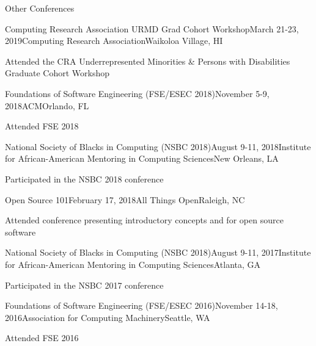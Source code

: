 \documentclass{resume} %
\begin{document}
\begin{rSection}{Other Conferences}

\begin{rSubsection}{Computing Research Association URMD Grad Cohort Workshop}{March 21-23, 2019}{Computing Research Association}{Waikoloa Village, HI}
\item Attended the CRA Underrepresented Minorities \& Persons with Disabilities Graduate Cohort Workshop
\end{rSubsection}
\begin{rSubsection}{Foundations of Software Engineering (FSE/ESEC 2018)}{November 5-9, 2018}{ACM}{Orlando, FL}
\item Attended FSE 2018
\end{rSubsection}
\begin{rSubsection}{National Society of Blacks in Computing (NSBC 2018)}{August 9-11, 2018}{Institute for African-American Mentoring in Computing Sciences}{New Orleans, LA}
\item Participated in the NSBC 2018 conference
\end{rSubsection}
\begin{rSubsection}{Open Source 101}{February 17, 2018}{All Things Open}{Raleigh, NC}
\item Attended conference presenting introductory concepts and for open source software
\end{rSubsection}
\begin{rSubsection}{National Society of Blacks in Computing (NSBC 2018)}{August 9-11, 2017}{Institute for African-American Mentoring in Computing Sciences}{Atlanta, GA}
\item Participated in the NSBC 2017 conference
\end{rSubsection}
\begin{rSubsection}{Foundations of Software Engineering (FSE/ESEC 2016)}{November 14-18, 2016}{Association for Computing Machinery}{Seattle, WA}
\item Attended FSE 2016
\end{rSubsection}
\end{rSection}
\end{document}
